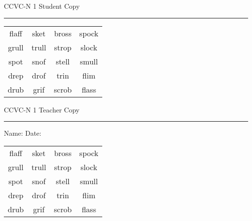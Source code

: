 \documentclass{memoir}
\begin{document}

\footnotesize \noindent
CCVC-N 1 \hfill Student Copy
\smallskip
\hrule

\Large

\setlength{\tabcolsep}{14pt}
\def\arraystretch{3}

{\selectfont


\begin{vplace}[0.5]
\begin{center}
\begin{tabular}{cccc}
flaff & sket & bross       & spock \\
grull            & trull & strop & slock            \\
spot & snof & stell & smull \\
drep & drof & trin & flim            \\
drub             & grif      & scrob & flass \\
\end{tabular}
\end{center}
\end{vplace}

}

\newpage

\footnotesize \noindent
CCVC-N 1 \hfill Teacher Copy
\smallskip
\hrule

\small

\vfill

\noindent
Name: \underline{\hspace{1.75in}} \hfill Date: \underline{\hspace{1in}}

\Large

{\selectfont


\begin{vplace}[0.5]
\begin{center}
\begin{tabular}{cccc}
flaff & sket & bross       & spock \\
grull            & trull & strop & slock            \\
spot & snof & stell & smull \\
drep & drof & trin & flim            \\
drub             & grif      & scrob & flass \\
\end{tabular}
\end{center}
\end{vplace}



}
\end{document}
